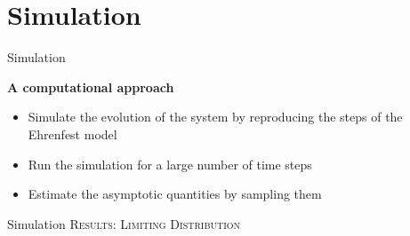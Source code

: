 \label{simulation}
\section{Simulation}

\begin{frame}{Simulation}
    \begin{center}
        \Large \textbf{A computational approach}
    \end{center}
    \centering
    \begin{itemize}
        \item<1-> \alert{Simulate} the evolution of the system by reproducing the steps of the Ehrenfest model
        \item <2-> Run the simulation for a \alert{large number of time steps}
        \item<3-> \alert{Estimate} the asymptotic quantities by sampling them
    \end{itemize}
\end{frame}

\begin{frame}{Simulation}
  \Large
  \centering
  \textsc{Results: Limiting Distribution}
  
\end{frame}

    

